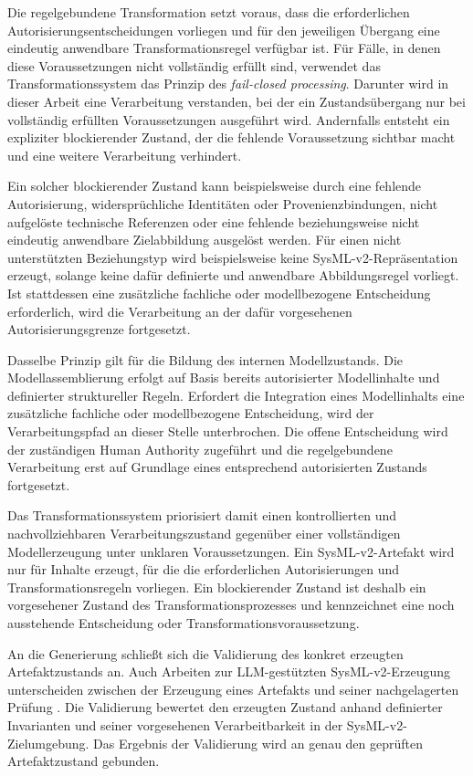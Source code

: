 Die regelgebundene Transformation setzt voraus, dass die erforderlichen
Autorisierungsentscheidungen vorliegen und für den jeweiligen Übergang eine
eindeutig anwendbare Transformationsregel verfügbar ist. Für Fälle, in denen
diese Voraussetzungen nicht vollständig erfüllt sind, verwendet das
Transformationssystem das Prinzip des \emph{fail-closed processing}. Darunter
wird in dieser Arbeit eine Verarbeitung verstanden, bei der ein
Zustandsübergang nur bei vollständig erfüllten Voraussetzungen ausgeführt
wird. Andernfalls entsteht ein expliziter blockierender Zustand, der die
fehlende Voraussetzung sichtbar macht und eine weitere Verarbeitung
verhindert.

Ein solcher blockierender Zustand kann beispielsweise durch eine fehlende
Autorisierung, widersprüchliche Identitäten oder Provenienzbindungen,
nicht aufgelöste technische Referenzen oder eine fehlende beziehungsweise
nicht eindeutig anwendbare Zielabbildung ausgelöst werden. Für einen nicht
unterstützten Beziehungstyp wird beispielsweise keine
SysML-v2-Repräsentation erzeugt, solange keine dafür definierte und
anwendbare Abbildungsregel vorliegt. Ist stattdessen eine zusätzliche
fachliche oder modellbezogene Entscheidung erforderlich, wird die
Verarbeitung an der dafür vorgesehenen Autorisierungsgrenze fortgesetzt.

Dasselbe Prinzip gilt für die Bildung des internen Modellzustands. Die
Modellassemblierung erfolgt auf Basis bereits autorisierter Modellinhalte und
definierter struktureller Regeln. Erfordert die Integration eines
Modellinhalts eine zusätzliche fachliche oder modellbezogene Entscheidung,
wird der Verarbeitungspfad an dieser Stelle unterbrochen. Die offene
Entscheidung wird der zuständigen Human Authority zugeführt und die
regelgebundene Verarbeitung erst auf Grundlage eines entsprechend
autorisierten Zustands fortgesetzt.

Das Transformationssystem priorisiert damit einen kontrollierten und
nachvollziehbaren Verarbeitungszustand gegenüber einer vollständigen
Modellerzeugung unter unklaren Voraussetzungen. Ein SysML-v2-Artefakt wird
nur für Inhalte erzeugt, für die die erforderlichen Autorisierungen und
Transformationsregeln vorliegen. Ein blockierender Zustand ist deshalb ein
vorgesehener Zustand des Transformationsprozesses und kennzeichnet eine noch
ausstehende Entscheidung oder Transformationsvoraussetzung.

An die Generierung schließt sich die Validierung des konkret erzeugten
Artefaktzustands an. Auch Arbeiten zur LLM-gestützten
SysML-v2-Erzeugung unterscheiden zwischen der Erzeugung eines Artefakts und
seiner nachgelagerten Prüfung \cite{Stein2026}. Die Validierung bewertet den
erzeugten Zustand anhand definierter Invarianten und seiner vorgesehenen
Verarbeitbarkeit in der SysML-v2-Zielumgebung. Das Ergebnis der Validierung
wird an genau den geprüften Artefaktzustand gebunden.

